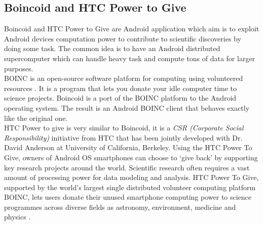 \subsection{Boincoid and HTC Power to Give}
Boincoid and HTC Power to Give are Android application which aim is  to exploit Android devices computation power to contribute to scientific discoveries by doing some task. The common idea is to have an Android distributed supercomputer which can handle heavy task and compute tons of data for larger purposes.\\
BOINC is an open-source software platform for computing using volunteered resources \cite{boinc2017open}. It is a program that lets you donate your idle computer time to science projects. Boincoid is a port of the BOINC platform to the Android operating system. The result is an Android BOINC client that behaves exactly like the original one.\\
HTC Power to give is very similar to Boincoid, it is a \textit{CSR (Corporate Social Responsibility)} initiative from HTC that has been jointly developed with Dr. David Anderson at University of California, Berkeley. Using the HTC Power To Give, owners of Android OS smartphones can choose to ‘give back’ by supporting key research projects around the world. Scientific research often requires a vast amount of processing power for data modeling and analysis. HTC Power To Give, supported by the world’s largest single distributed volunteer computing platform BOINC, lets users donate their unused smartphone computing power to science programmes across diverse fields as astronomy, environment, medicine and physics \cite{htc2017power}.
 
